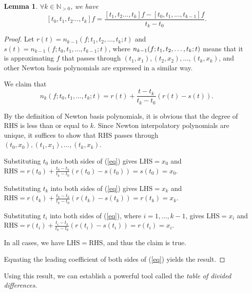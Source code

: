 \documentclass[a4paper,11pt,titlepage]{article}
\theoremstyle{definition}
\theoremstyle{plain}
\newtheorem{lemma}[theorem]{Lemma}
\theoremstyle{remark}
\begin{document}
\begin{lemma}\label{lemma52}
    $\forall k\in\mathbb{N}_{>0}$, we have $$[t_0,t_1,t_2\dots,t_k]f=\frac{[t_1,t_2\dots,t_k]f-[t_0,t_1,\dots,t_{k-1}]f}{t_k-t_0}.$$
\end{lemma}
\begin{proof}
    \cite{Gautschi2012} Let $r(t)=n_{k-1}(f;t_1,t_2,\dots,t_k;t)$ and $s(t)=n_{k-1}(f;t_0,t_1,\dots,t_{k-1};t)$, where $n_{k-1}(f;\\t_1,t_2,\dots,t_k;t)$ means that it is approximating $f$ that passes through $(t_1,x_1), (t_2,x_2), \dots, (t_k,x_k)$, and other Newton basis polynomials are expressed in a similar way.
    
    We claim that
    \begin{equation}\label{eq}
        n_k(f;t_0,t_1,\dots,t_k;t)=r(t)+\frac{t-t_k}{t_k-t_0}(r(t)-s(t)).\tag{*}
    \end{equation}

    By the definition of Newton basis polynomials, it is obvious that the degree of $\mathrm{RHS}$ is less than or equal to $k$. Since Newton interpolatory polynomials are unique, it suffices to show that $\mathrm{RHS}$ passes through $(t_0,x_0), (t_1,x_1), \dots, (t_k,x_k)$.
    
    Substituting $t_0$ into both sides of (\ref{eq}) gives $\mathrm{LHS}=x_0$ and $\mathrm{RHS}=r(t_0)+\frac{t_0-t_k}{t_k-t_0}(r(t_0)-s(t_0))=s(t_0)=x_0.$

    Substituting $t_k$ into both sides of (\ref{eq}) gives $\mathrm{LHS}=x_k$ and $\mathrm{RHS}=r(t_k)+\frac{t_k-t_k}{t_k-t_0}(r(t_k)-s(t_k))=r(t_k)=x_k.$

    Substituting $t_i$ into both sides of (\ref{eq}), where $i=1,\dots,k-1$, gives $\mathrm{LHS}=x_i$ and $\mathrm{RHS}=r(t_i)+\frac{t_i-t_k}{t_k-t_0}(r(t_i)-s(t_i))=r(t_i)=x_i.$

    In all cases, we have $\mathrm{LHS} = \mathrm{RHS}$, and thus the claim is true.

    Equating the leading coefficient of both sides of (\ref{eq}) yields the result.
\end{proof}

Using this result, we can establish a powerful tool called the \textit{table of divided differences}.
\end{document}
